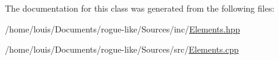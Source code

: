 The documentation for this class was generated from the following files\-:\begin{DoxyCompactItemize}
\item 
/home/louis/\-Documents/rogue-\/like/\-Sources/inc/\hyperlink{_elements_8hpp}{Elements.\-hpp}\item 
/home/louis/\-Documents/rogue-\/like/\-Sources/src/\hyperlink{_elements_8cpp}{Elements.\-cpp}\end{DoxyCompactItemize}
